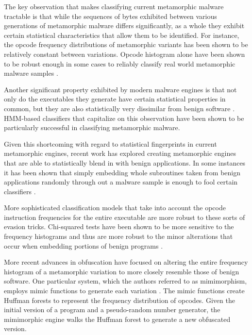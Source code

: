     The key observation that makes classifying current metamorphic malware
    tractable is that while the sequences of bytes exhibited between various
    generations of metamorphic malware differs significantly, as a whole they
    exhibit certain statistical characteristics that allow them to be
    identified. For instance, the opcode frequency distributions of metamorphic
    variants has been shown to be relatively constant between variations. Opcode
    histogram alone have been shown to be robust enough in some cases to
    reliably classify real world metamorphic malware samples \cite{histogram}.

    Another significant property exhibited by modern malware engines is that not
    only do the executables they generate have certain statistical properties in
    common, but they are also statistically very dissimilar from benign software
    \cite{hmm_detect}. HMM-based classifiers that capitalize on this observation
    have been shown to be particularly successful in classifying metamorphic
    malware.

    Given this shortcoming with regard to statistical fingerprints in current
    metamorphic engines, recent work has explored creating metamorphic engines
    that are able to statistically blend in with benign applications. In some
    instances it has been shown that simply embedding whole subroutines taken
    from benign applications randomly through out a malware sample is enough to
    fool certain classifiers \cite{hmm_evade}.

    More sophisticated classification models that take into account the opcode
    instruction frequencies for the entire executable are more robust to these
    sorts of evasion tricks. Chi-squared tests have been shown to be more
    sensitive to the frequency histograms and thus are more robust to the minor
    alterations that occur when embedding portions of benign programs
    \cite{chisquared}.

    More recent advances in obfuscation have focused on altering the entire
    frequency histogram of a metamorphic variation to more closely resemble
    those of benign software. One particular system, which the authors referred
    to as mimimorphism, employs mimic functions to generate each variation
    \cite{mimimorph}. The mimic functions create Huffman forests to represent
    the frequency distribution of opcodes. Given the initial version of a
    program and a pseudo-random number generator, the mimimorphic engine walks
    the Huffman forest to generate a new obfuscated version.

